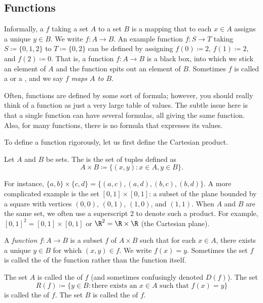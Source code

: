 \subsection{Functions}

Informally,
a \emph{}
$f$ taking a set $A$ to a set $B$
is a mapping that to each $x \in A$ assigns a unique $y \in B$.  We write
$f \colon A \to B$.  An example function 
$f \colon S \to T$ taking $S \coloneqq \{ 0, 1, 2 \}$ to $T \coloneqq \{ 0, 2 \}$
can be defined
by assigning $f(0) \coloneqq 2$, $f(1) \coloneqq 2$, and $f(2) \coloneqq 0$.  That is, a function $f
\colon A \to B$ is
a black box, into which we stick an element of $A$ and the function
spits out an element of $B$.
Sometimes $f$ is called a \emph{} or a
\emph{},
and we say $f$ \emph{maps $A$ to $B$}.


Often, functions are defined by some sort of
formula; however, you should really think of a function as just a very large
table of values.
The subtle issue here is that a single function can have several 
formulas, all giving the same function.  Also, for many functions, there is
no formula that expresses its values.

To define a function rigorously, let us first define the Cartesian product.

\begin{defn}
Let $A$ and $B$ be sets.  The \emph{}
is the set of tuples defined as
\begin{equation*}
A \times B \coloneqq
\bigl\{ (x,y) : x \in A, y \in B \bigr\} .
\end{equation*}
\end{defn}

For instance, $\{ a,b \} \times \{ c , d\} =
\bigl\{
(a,c), (a,d), (b,c), (b,d)
\bigr\}$.
A more complicated example is the set $[0,1] \times [0,1]$: a subset of the
plane bounded by a square with vertices $(0,0)$, $(0,1)$, $(1,0)$, and $(1,1)$.
When $A$ and $B$ are the same set, we often use a superscript 2 to denote
such a product.  For example, $[0,1]^2 = 
[0,1] \times [0,1]$ or $\R^2 = \R \times \R$ (the Cartesian plane).

\begin{defn}
A \emph{function} $f \colon A \to B$ is a subset $f$ of $A \times B$
such that for each $x \in A$, there exists a unique $y \in B$ for which $(x,y) \in f$.
We write $f(x) = y$.  Sometimes
the set $f$ is called the \emph{} of the function rather than
the function itself.

The set $A$ is called the \emph{} of $f$ (and
sometimes confusingly denoted $D(f)$).  The set
\begin{equation*}
R(f) \coloneqq \{ y \in B : \text{there exists an } x \in A \text{ such that }
f(x)=y \}
\end{equation*}
is called the \emph{} of $f$.
The set $B$ is called the \emph{} of $f$.
\end{defn}


